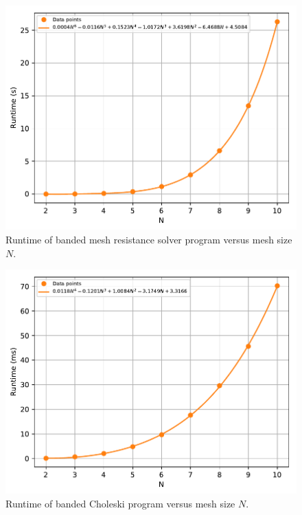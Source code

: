 \documentclass[a4paper,titlepage]{article}
\begin{document}
	\begin{figure}[!htb]
		\centering
		\includegraphics[width=\columnwidth]{plots/q2c.pdf}
		\caption
		{Runtime of banded mesh resistance solver program versus mesh size $N$.}
		\label{fig:q2c}
	\end{figure}


	\begin{figure}[!htb]
		\centering
		\includegraphics[width=\columnwidth]{plots/q2c_choleski.pdf}
		\caption
		{Runtime of banded Choleski program versus mesh size $N$.}
		\label{fig:q2c_choleski}
	\end{figure}
\end{document}
